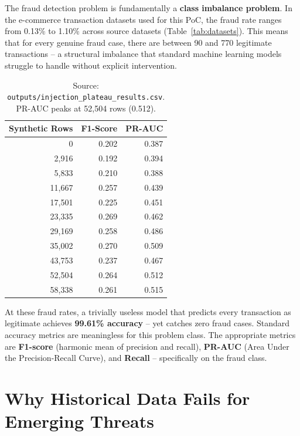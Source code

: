 \documentclass[12pt,a4paper,oneside]{book}
\begin{document}
The fraud detection problem is fundamentally a \textbf{class imbalance problem}. In the e-commerce transaction datasets used for this PoC, the fraud rate ranges from 0.13\% to 1.10\% across source datasets (Table~\ref{tab:datasets}). This means that for every genuine fraud case, there are between 90 and 770 legitimate transactions -- a structural imbalance that standard machine learning models struggle to handle without explicit intervention.

\begin{table}[H]
    \centering
    \caption{Plateau Experiment -- F1 and PR-AUC at Each Injection Volume} \label{tab:plateau}
    \begin{tabular}{r r r}
        \toprule
        \textbf{Synthetic Rows} & \textbf{F1-Score} & \textbf{PR-AUC} \\ \midrule
        0       & 0.202 & 0.387 \\
        2,916   & 0.192 & 0.394 \\
        5,833   & 0.210 & 0.388 \\
        11,667  & 0.257 & 0.439 \\
        17,501  & 0.225 & 0.451 \\
        23,335  & 0.269 & 0.462 \\
        29,169  & 0.258 & 0.486 \\
        35,002  & 0.270 & 0.509 \\
        43,753  & 0.237 & 0.467 \\
        52,504  & 0.264 & 0.512 \\
        58,338  & 0.261 & 0.515 \\
        \bottomrule
    \end{tabular}
    \caption*{Source: \texttt{outputs/injection\_plateau\_results.csv}. PR-AUC peaks at 52,504 rows (0.512).}
\end{table}


At these fraud rates, a trivially useless model that predicts every transaction as legitimate achieves \textbf{99.61\% accuracy} -- yet catches zero fraud cases. Standard accuracy metrics are meaningless for this problem class. The appropriate metrics are \textbf{F1-score} (harmonic mean of precision and recall), \textbf{PR-AUC} (Area Under the Precision-Recall Curve), and \textbf{Recall} -- specifically on the fraud class.

\section{Why Historical Data Fails for Emerging Threats}
\end{document}
